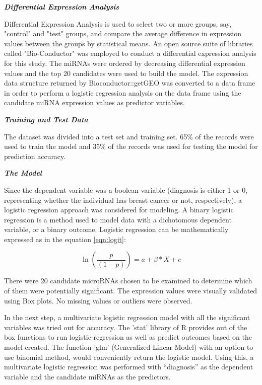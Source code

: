 \documentclass{bioinfo}
\begin{document}
\begin{methods}
{\textbf {\emph{Differential Expression Analysis}}}

Differential Expression Analysis is used to select two or more groups, say, "control" and "test" groups, and compare the average difference in expression values between the groups by statistical means. An open source suite of libraries called "Bio-Conductor" \cite{geoquery} was employed to conduct a differential expression analysis for this study. The miRNAs were ordered by decreasing differential expression values and the top 20 candidates were used to build the model. The expression data structure returned by Bioconductor::getGEO was converted to a data frame in order to perform a logistic regression analysis on the data frame using the candidate miRNA expression values as predictor variables. 


{\textbf {\emph{Training and Test Data}}}

The dataset was divided into a test set and training set. 65\% of the records were used to train the model and 35\% of the records was used for testing the model for prediction accuracy.


{\textbf {\emph{The Model}}}

Since the dependent variable was a boolean variable (diagnosis is either 1 or 0, representing whether the individual has breast cancer or not, respectively), a logistic regression approach was considered for modeling. A binary logistic regression is a method used to model data with a dichotomous dependent variable, or a binary outcome. Logistic regression can be mathematically expressed as in the equation \ref{eqn:logit}:

\begin{equation}
\label{eqn:logit}
    \ln(\frac{p}{(1-p)}) = a + \beta * X + e
\end{equation}

There were 20 candidate microRNAs chosen to be examined to determine which of them were potentially significant. The expression values were visually validated using Box plots. No missing values or outliers were observed. 

In the next step, a multivariate logistic regression model with all the significant variables was tried out for accuracy. The 'stat' library of R provides out of the box functions to run logistic regression as well as predict outcomes based on the model created. The function 'glm' (Generalized Linear Model) with an option to use binomial method, would conveniently return the logistic model. Using this, a multivariate logistic regression was performed with “diagnosis” as the dependent variable and the candidate miRNAs as the predictors.



\end{methods}
\end{document}
